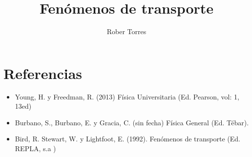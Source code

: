 \documentclass[12pt]{article}
\title{Fenómenos de transporte}
\author{Rober Torres}
\begin{document}
    \maketitle
    \tableofcontents
    
    
    \section{Referencias}
    \begin{itemize}
        \item Young, H. y Freedman, R. (2013) Física Universitaria (Ed. Pearson, vol: 1, 13ed)
        \item Burbano, S., Burbano, E. y Gracia, C. (sin fecha) Física General (Ed. Tébar).
        \item Bird, R. Stewart, W. y Lightfoot, E. (1992). Fenómenos de transporte (Ed. REPLA, s.a )
    \end{itemize}
\end{document}
